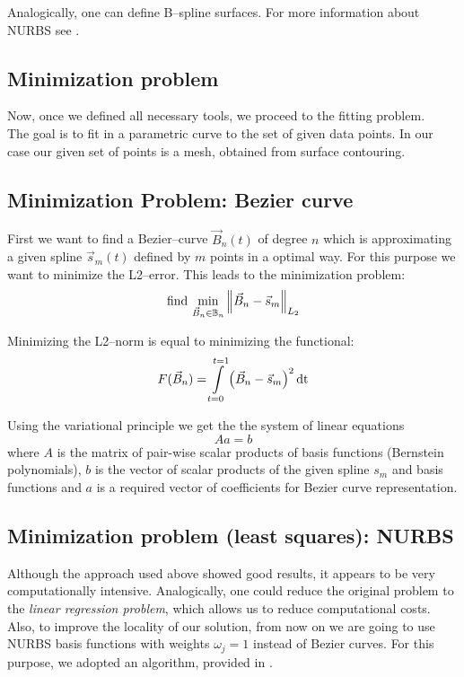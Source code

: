 Analogically, one can define B--spline surfaces. For more information about NURBS see \cite{farin1999nurbs}.
\subsection{Minimization problem}
Now, once we defined all necessary tools, we proceed to the fitting problem.\\
The goal is to fit in a parametric curve to the set of given data points. In our case our given set of points is a mesh, obtained from surface contouring.
\subsection{Minimization Problem: Bezier curve}
First we want to find a Bezier--curve $\vec{B}_n\left(t\right)$ of degree $n$ which is approximating a given spline $\vec{s}_m\left(t\right)$ defined by $m$ points in a optimal way. For this purpose we want to minimize the L2--error. This leads to the minimization problem:
\begin{equation}
\text{find\ } \underset{\vec{B}_n\in \mathbb{B}_n}{\min} \Ltwonorm{\vec{B}_n-\vec{s}_m}
\end{equation}

Minimizing the L2--norm is equal to minimizing the functional:
\begin{equation}
F(\vec{B}_n)=\int\limits_{t=0}^{t=1} \left(\vec{B}_n-\vec{s}_m\right)^2\dt
\end{equation}

Using the variational principle we get the the system of linear equations
\begin{equation}
A a = b
\end{equation}
where $A$ is the matrix of pair-wise scalar products of basis functions (Bernstein polynomials), $b$ is the vector of scalar products of the given spline $s_{m}$ and basis functions and $a$ is a required vector of coefficients for Bezier curve representation.

\subsection{Minimization problem (least squares): NURBS}
Although the approach used above showed good results, it appears to be very computationally intensive. Analogically, one could reduce the original problem to the \textit{linear regression problem}, which allows us to reduce computational costs. Also, to improve the locality of our solution, from now on we are going to use NURBS basis functions with weights $\omega_{j} = 1$ instead of Bezier curves. For this purpose, we adopted an algorithm, provided in \cite{becker2011advanced}.

